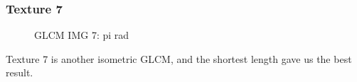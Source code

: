 \documentclass{article}
\begin{document}
\newpage
	\subsubsection{Texture 7}
		\begin{figure}[h]%
			\centering
    		\qquad
    		\qquad
    		    		\qquad

    		\caption{GLCM IMG 7: pi rad}%
    		\label{fig:GLCM_7}%
		\end{figure}
		Texture 7 is another isometric GLCM, and the shortest length gave us the best result.
\end{document}
